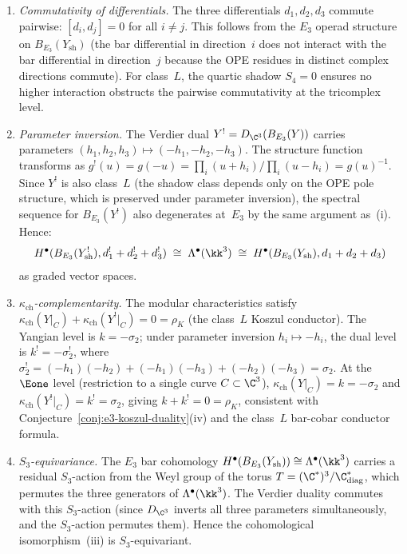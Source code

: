 \begin{theorem}
\begin{enumerate}[label=\textup{(\roman*)}]
 \item \emph{Commutativity of differentials.} The three differentials $d_1, d_2, d_3$ commute pairwise: $[d_i, d_j] = 0$ for all $i \neq j$. This follows from the $E_3$ operad structure on \(B_{E_3}(Y_{\mathrm{sh}})\) (the bar differential in direction~$i$ does not interact with the bar differential in direction~$j$ because the OPE residues in distinct complex directions commute). For class~$L$, the quartic shadow $S_4 = 0$ ensures no higher interaction obstructs the pairwise commutativity at the tricomplex level.

 \item \emph{Parameter inversion.} The Verdier dual $Y^! = D_{\C^3}(B_{E_3}(Y))$ carries parameters $(h_1, h_2, h_3) \mapsto (-h_1, -h_2, -h_3)$. The structure function transforms as $g^!(u) = g(-u) = \prod_i (u + h_i) / \prod_i (u - h_i) = g(u)^{-1}$. Since $Y^!$ is also class~$L$ (the shadow class depends only on the OPE pole structure, which is preserved under parameter inversion), the spectral sequence for $B_{E_3}(Y^!)$ also degenerates at~$E_3$ by the same argument as~(i). Hence:
 \[
 H^\bullet(B_{E_3}(Y_{\mathrm{sh}}^!), d_1^! + d_2^! + d_3^!) \;\cong\; \Lambda^\bullet(\kk^3) \;\cong\; H^\bullet(B_{E_3}(Y_{\mathrm{sh}}), d_1 + d_2 + d_3)
 \]
 as graded vector spaces.

 \item \emph{$\kappa_{\mathrm{ch}}$-complementarity.} The modular characteristics satisfy $\kappa_{\mathrm{ch}}(Y|_C) + \kappa_{\mathrm{ch}}(Y^!|_C) = 0 = \rho_K$ (the class~$L$ Koszul conductor). The Yangian level is $k = -\sigma_2$; under parameter inversion $h_i \mapsto -h_i$, the dual level is $k^! = -\sigma_2^!$, where $\sigma_2^! = (-h_1)(-h_2) + (-h_1)(-h_3) + (-h_2)(-h_3) = \sigma_2$. At the $\Eone$ level (restriction to a single curve $C \subset \C^3$), $\kappa_{\mathrm{ch}}(Y|_C) = k = -\sigma_2$ and $\kappa_{\mathrm{ch}}(Y^!|_C) = k^! = \sigma_2$, giving $k + k^! = 0 = \rho_K$, consistent with Conjecture~\ref{conj:e3-koszul-duality}(iv) and the class~$L$ bar-cobar conductor formula.

 \item \emph{$S_3$-equivariance.} The $E_3$ bar cohomology $H^\bullet(B_{E_3}(Y_{\mathrm{sh}})) \cong \Lambda^\bullet(\kk^3)$ carries a residual $S_3$-action from the Weyl group of the torus $T = (\C^*)^3/\C^*_{\mathrm{diag}}$, which permutes the three generators of $\Lambda^\bullet(\kk^3)$. The Verdier duality commutes with this $S_3$-action (since $D_{\C^3}$ inverts all three parameters simultaneously, and the $S_3$-action permutes them). Hence the cohomological isomorphism~(iii) is $S_3$-equivariant.
\end{enumerate}
\end{theorem}

